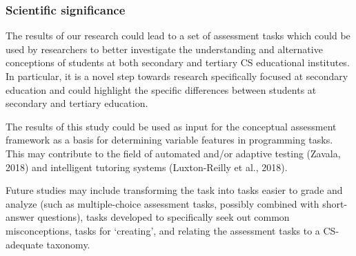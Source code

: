 

\subsubsection*{Scientific significance}
The results of our research could lead to a set of assessment tasks which could be used by researchers to better investigate the understanding and alternative conceptions of students at both secondary and tertiary CS educational institutes. In particular, it is a novel step towards research specifically focused at secondary education and could highlight the specific differences between students at secondary and tertiary education.

The results of this study could be used as input for the conceptual assessment framework as a basis for determining variable features in programming tasks. This may contribute to the field of automated and/or adaptive testing (Zavala, 2018) and intelligent tutoring systems (Luxton-Reilly et al., 2018).


Future studies may include transforming the task into tasks easier to grade and analyze (such as multiple-choice assessment tasks, possibly combined with short-answer questions), tasks developed to specifically seek out common misconceptions, tasks for ‘creating’, and relating the assessment tasks to a CS-adequate taxonomy.

